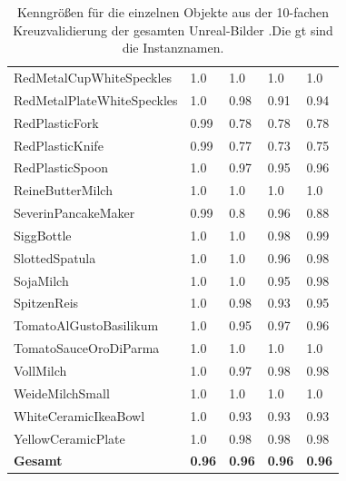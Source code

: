 \begin{table}
\begin{tabularx}{\textwidth}{Xllll}
RedMetalCupWhiteSpeckles & 1.0 & 1.0 & 1.0 & 1.0 \\  
RedMetalPlateWhiteSpeckles & 1.0 & 0.98 & 0.91 & 0.94 \\  
RedPlasticFork & 0.99 & 0.78 & 0.78 & 0.78 \\  
RedPlasticKnife & 0.99 & 0.77 & 0.73 & 0.75 \\  
RedPlasticSpoon & 1.0 & 0.97 & 0.95 & 0.96 \\  
ReineButterMilch & 1.0 & 1.0 & 1.0 & 1.0 \\  
SeverinPancakeMaker & 0.99 & 0.8 & 0.96 & 0.88 \\  
SiggBottle & 1.0 & 1.0 & 0.98 & 0.99 \\  
SlottedSpatula & 1.0 & 1.0 & 0.96 & 0.98 \\  
SojaMilch & 1.0 & 1.0 & 0.95 & 0.98 \\  
SpitzenReis & 1.0 & 0.98 & 0.93 & 0.95 \\  
TomatoAlGustoBasilikum & 1.0 & 0.95 & 0.97 & 0.96 \\  
TomatoSauceOroDiParma & 1.0 & 1.0 & 1.0 & 1.0 \\  
VollMilch & 1.0 & 0.97 & 0.98 & 0.98 \\  
WeideMilchSmall & 1.0 & 1.0 & 1.0 & 1.0 \\  
WhiteCeramicIkeaBowl & 1.0 & 0.93 & 0.93 & 0.93 \\  
YellowCeramicPlate & 1.0 & 0.98 & 0.98 & 0.98 \\    \hline
\textbf{Gesamt}		&	\textbf{0.96}   &	\textbf{0.96}  & \textbf{0.96}     &  \textbf{0.96}     \\
\end{tabularx}
\caption[Objektinstanzen-spezifische Kenngrößen des gesamten Unreal-Bilder Datensatzes]{Kenngrößen für die einzelnen Objekte aus der 10-fachen Kreuzvalidierung der gesamten Unreal-Bilder .Die \gls{gt} sind die Instanznamen.}
\label{tab:UnrealGTInstance_metrics}
\end{table}

